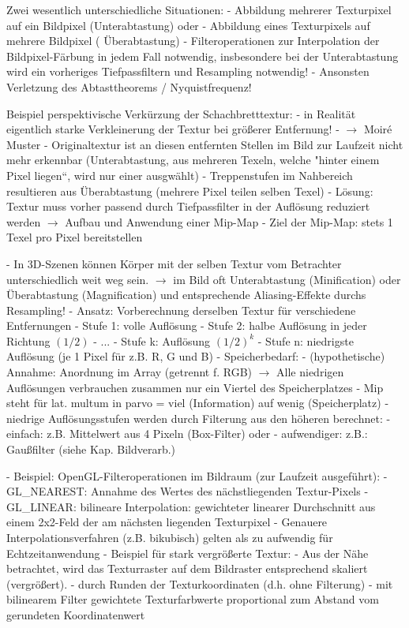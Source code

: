 \documentclass[10pt,landscape]{article}
\begin{document}
\begin{multicols}{3}
  Zwei wesentlich unterschiedliche Situationen:
  - Abbildung mehrerer Texturpixel auf ein Bildpixel (Unterabtastung) oder
  - Abbildung eines Texturpixels auf mehrere Bildpixel ( Überabtastung)
  - Filteroperationen zur Interpolation der Bildpixel-Färbung in jedem Fall notwendig, insbesondere bei der Unterabtastung wird ein vorheriges Tiefpassfiltern und Resampling notwendig!
  - Ansonsten Verletzung des Abtasttheorems / Nyquistfrequenz!
  
  Beispiel perspektivische Verkürzung der Schachbretttextur:
  - in Realität eigentlich starke Verkleinerung der Textur bei größerer Entfernung!
  - $\rightarrow$ Moiré Muster - Originaltextur ist an diesen entfernten Stellen im Bild zur Laufzeit nicht mehr erkennbar (Unterabtastung, aus mehreren Texeln, welche "hinter einem Pixel liegen“, wird nur einer ausgwählt)
  - Treppenstufen im Nahbereich resultieren aus Überabtastung (mehrere Pixel teilen selben Texel)
  - Lösung: Textur muss vorher passend durch Tiefpassfilter in der Auflösung reduziert werden $\rightarrow$ Aufbau und Anwendung einer Mip-Map
  - Ziel der Mip-Map: stets 1 Texel pro Pixel bereitstellen
  
  
  - In 3D-Szenen können Körper mit der selben Textur vom Betrachter unterschiedlich weit weg sein. $\rightarrow$ im Bild oft Unterabtastung (Minification) oder Überabtastung (Magnification) und entsprechende Aliasing-Effekte durchs Resampling!
  - Ansatz: Vorberechnung derselben Textur für verschiedene Entfernungen
  - Stufe 1: volle Auflösung
  - Stufe 2: halbe Auflösung in jeder Richtung $(1/2)$
  - ...
  - Stufe k: Auflösung $(1/2)^k$
  - Stufe n: niedrigste Auflösung (je 1 Pixel für z.B. R, G und B)
  - Speicherbedarf:
  - (hypothetische) Annahme: Anordnung im Array (getrennt f. RGB) $\rightarrow$ Alle niedrigen Auflösungen verbrauchen zusammen nur ein Viertel des Speicherplatzes
  - Mip steht für lat. multum in parvo = viel (Information) auf wenig (Speicherplatz)
  - niedrige Auflösungsstufen werden durch Filterung aus den höheren berechnet:
  - einfach: z.B. Mittelwert aus 4 Pixeln (Box-Filter) oder
  - aufwendiger: z.B.: Gaußfilter (siehe Kap. Bildverarb.)
  
  - Beispiel: OpenGL-Filteroperationen im Bildraum (zur Laufzeit ausgeführt):
  - GL\_NEAREST: Annahme des Wertes des nächstliegenden Textur-Pixels
  - GL\_LINEAR: bilineare Interpolation: gewichteter linearer Durchschnitt aus einem 2x2-Feld der am nächsten liegenden Texturpixel
  - Genauere Interpolationsverfahren (z.B. bikubisch) gelten als zu aufwendig für Echtzeitanwendung
  - Beispiel für stark vergrößerte Textur:
  - Aus der Nähe betrachtet, wird das Texturraster auf dem Bildraster entsprechend skaliert (vergrößert).
  - durch Runden der Texturkoordinaten (d.h. ohne Filterung)
  - mit bilinearem Filter gewichtete Texturfarbwerte proportional zum Abstand vom gerundeten Koordinatenwert
  

\end{multicols}
\end{document}
